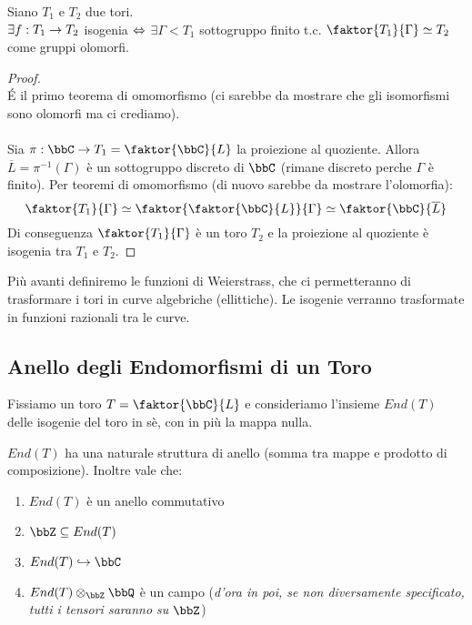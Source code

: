 \begin{proposizione}
Siano $T_{1}$ e $T_{2}$ due tori.\\
$\exists f:T_{1} \rightarrow T_{2}$ isogenia $\Leftrightarrow$ $\exists \Gamma < T_{1}$ sottogruppo finito t.c. $\faktor{T_{1}}{\Gamma} \simeq T_{2}$ come gruppi olomorfi. 
\end{proposizione}
\begin{proof}
\fbox{$\Rar$}\\
\'E il primo teorema di omomorfismo (ci sarebbe da mostrare che gli isomorfismi sono olomorfi ma ci crediamo).\\
\fbox{$\Leftarrow$}\\
Sia $\pi:\bbC \rar T_{1} = \faktor{\bbC}{L}$ la proiezione al quoziente. Allora $\overline{L}=\pi^{-1}(\Gamma)$ è un sottogruppo discreto di $\bbC$ (rimane discreto perche $\Gamma$ è finito). Per teoremi di omomorfismo (di nuovo sarebbe da mostrare l'olomorfia):
$$\faktor{T_{1}}{\Gamma} \simeq \faktor{\faktor{\bbC}{L}}{\Gamma} \simeq \faktor{\bbC}{\overline{L}}$$
Di conseguenza $\faktor{T_{1}}{\Gamma}$ è un toro $T_{2}$ e la proiezione al quoziente è isogenia tra $T_{1}$ e $T_{2}$.
\end{proof}

Più avanti definiremo le funzioni di Weierstrass, che ci permetteranno di trasformare i tori in curve algebriche (ellittiche). Le isogenie verranno trasformate in funzioni razionali tra le curve.

\subsection{Anello degli Endomorfismi di un Toro}

Fissiamo un toro $T=\faktor{\bbC}{L}$ e consideriamo l'insieme $End(T)$ delle isogenie del toro in sè, con in più la mappa nulla.

\begin{proposizione} $End(T)$ ha una naturale struttura di anello (somma tra mappe e prodotto di composizione). Inoltre vale che:
\begin{enumerate}
\item $End(T)$ è un anello commutativo
\item $\bbZ \subseteq End(T)$
\item $End(T) \hookrightarrow \bbC$
\item $End(T) \otimes_{\bbZ} \bbQ$ è un campo ({\it d'ora in poi, se non diversamente specificato, tutti i tensori saranno su $\bbZ$})
\end{enumerate}
\end{proposizione}


